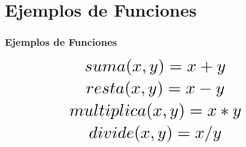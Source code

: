 \section{Ejemplos de Funciones}

\begin{frame}
\frametitle{Ejemplos de Funciones}

\[\Scale[2]{suma(x, y) = x + y}\]
\[\Scale[2]{resta(x, y) = x - y}\]
\[\Scale[2]{multiplica(x, y) = x * y}\]
\[\Scale[2]{divide(x, y) = x / y}\]

\end{frame}
